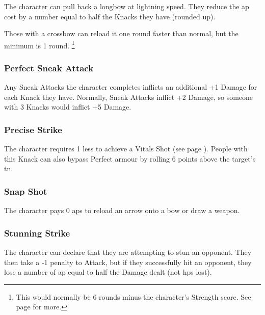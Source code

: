 \begin{multicols}{2}
The character can pull back a longbow at lightning speed.
They reduce the \gls{ap} cost by a number equal to half the Knacks they have (rounded up).

Those with a crossbow can reload it one round faster than normal, but the minimum is 1 round.%
\footnote{This would normally be 6 rounds minus the character's Strength score. See page \pageref{crossbow} for more.}

\subsubsection{Perfect Sneak Attack}

Any Sneak Attacks the character completes inflicts an additional +1 Damage for each Knack they have.
Normally, Sneak Attacks inflict +2 Damage, so someone with 3 Knacks would inflict +5 Damage.

\subsubsection{Precise Strike}\label{precisestrike}

The character requires 1 less to achieve a Vitals Shot (see page \pageref{vitals}).
\iftoggle{verbose}{
  For example, when targeting an opponent with an Attack score of +2 and Partial armour, someone would normally require a score of 9 to hit and a score of 12 to make a Vitals Shot which ignores all armour.
  With this Knack they still require a score of 9 to hit but only a score of 11 to make a Vitals Shot.
}{}
People with this Knack can also bypass Perfect armour by rolling 6 points above the target's \gls{tn}.

\subsubsection{Snap Shot}

The character pays 0 \glspl{ap} to reload an arrow onto a bow or draw a weapon.

\subsubsection{Stunning Strike}\label{stunningstrike}

The character can declare that they are attempting to stun an opponent.
They then take a -1 penalty to Attack, but if they successfully hit an opponent, they lose a number of \gls{ap} equal to half the Damage dealt (not \glspl{hp} lost).


\end{multicols}
